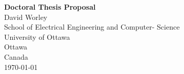 \documentclass{article}
\theoremstyle{definition}
\begin{document}
\begin{titlepage}
\begin{center}
    \Huge \textbf{Doctoral Thesis Proposal} \\
    \vspace{.5cm}
    \LARGE David Worley \\
    \vfill
    \large
    School of Electrical Engineering and Computer- Science \\
    University of Ottawa\\
    Ottawa \\
    Canada \\
    \today
\end{center}
\end{titlepage}






\end{document}
